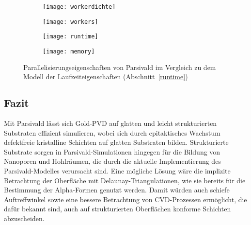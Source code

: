 \begin{figure}[H]
  \centering
  \captionsetup[subfigure]{singlelinecheck=false}
  \def\subfigwidth{7cm}
  \begin{subfigure}[t]{\subfigwidth}
    \texttt{[image: workerdichte]}
    \label{fig:goldscala-density}
  \end{subfigure}
  \hfill
  \begin{subfigure}[t]{\subfigwidth}
    \texttt{[image: workers]}
    \label{fig:goldscala-workers}
  \end{subfigure}

  \vspace{1em}

  \begin{subfigure}[t]{\subfigwidth}
    \texttt{[image: runtime]}
    \label{fig:goldscala-runtime}
  \end{subfigure}
  \hfill
  \begin{subfigure}[t]{\subfigwidth}
    \texttt{[image: memory]}
    \label{fig:goldscala-memory}
  \end{subfigure}
  \caption{Parallelisierungseigenschaften von Parsivald im Vergleich zu dem Modell der Laufzeiteigenschaften (Abschnitt~\ref{runtime})}
  \label{fig:goldscala}
\end{figure}

\subsection{Fazit}

Mit Parsivald lässt sich Gold-PVD auf glatten und leicht strukturierten Substraten effizient simulieren, wobei sich durch epitaktisches Wachstum defektfreie kristalline Schichten auf glatten Substraten bilden.
Strukturierte Substrate sorgen in Parsivald-Simulationen hingegen für die Bildung von Nanoporen und Hohlräumen, die durch die aktuelle Implementierung des Parsivald-Modelles verursacht sind.
Eine mögliche Lösung wäre die implizite Betrachtung der Oberfläche mit Delaunay-Triangulationen, wie sie bereits für die Bestimmung der Alpha-Formen genutzt werden.
Damit würden auch schiefe Auftreffwinkel sowie eine bessere Betrachtung von CVD-Prozessen ermöglicht, die dafür bekannt sind, auch auf strukturierten Oberflächen konforme Schichten abzuscheiden\cite{granneman_thin_1993}.

